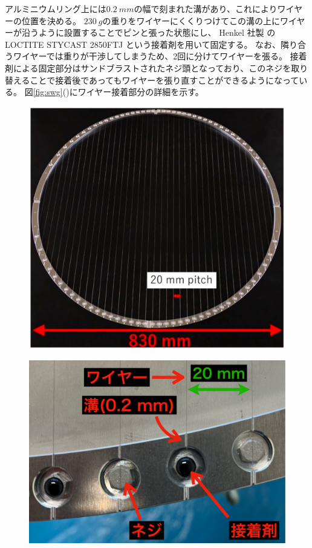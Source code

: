 \documentclass[../../main.tex]{subfiles}
\begin{document}
アルミニウムリング上には$\SI{0.2}{mm}$の幅で刻まれた溝があり、これによりワイヤーの位置を決める。
$\SI{230}{g}$の重りをワイヤーにくくりつけてこの溝の上にワイヤーが沿うように設置することでピンと張った状態にし、
Henkel 社製 の LOCTITE STYCAST 2850FTJ という接着剤を用いて固定する。
なお、隣り合うワイヤーでは重りが干渉してしまうため、2回に分けてワイヤーを張る。
接着剤による固定部分はサンドブラストされたネジ頭となっており、このネジを取り替えることで接着後であってもワイヤーを張り直すことができるようになっている。
図\ref{fig:swg}()にワイヤー接着部分の詳細を示す。
\begin{figure}[H]
    \begin{minipage}[b]{0.48\columnwidth}
        \centering
        \includegraphics[width=\columnwidth]{wiregrid/wiregrid_appearance.pdf}
        \subcaption{}
        \label{fig:wiregrid_appearance}
    \end{minipage}
    \hspace{0.02\columnwidth}
    \begin{minipage}[b]{0.48\columnwidth}
        \centering
        \includegraphics[width=\columnwidth]{wiregrid/wire_detail_view.pdf}

\end{minipage}
\end{figure}
\end{document}
